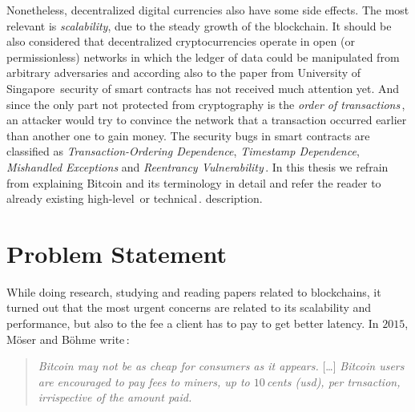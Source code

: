 \documentclass[USenglish]{uit-thesis}
\begin{document}
Nonetheless, decentralized digital currencies also have some side effects.
The most relevant is \emph{scalability}, due to the steady growth of the
blockchain. It should be also considered that
decentralized cryptocurrencies operate in open (or permissionless) networks
in which the ledger of data could be manipulated from arbitrary adversaries and
according also to the paper from University of Singapore\,\cite{Luu:2016}
security of smart contracts has not received much attention yet. And since the
only part not protected from cryptography is the \emph{order of transactions}\,\cite{ethereum_white_paper},
an attacker would try to convince the network that a transaction
occurred earlier than another one to gain money.
The security bugs in smart contracts are classified as \emph{Transaction-Ordering Dependence},
\emph{Timestamp Dependence}, \emph{Mishandled Exceptions}
and \emph{Reentrancy Vulnerability}\,\cite{Luu:2016}.
In this thesis we refrain from explaining Bitcoin and its terminology in detail
and refer the reader to already existing high-level\,\cite{Underwood:2016:BBB,
Bohme2015BETG}
or technical\,\cite{Nakamoto_bitcoin, ethereum_white_paper}.
 description.
\section{Problem Statement}
\label{sec:probdefinition}

While doing research, studying and reading papers related to blockchains,
it turned out that the most urgent concerns are related to
its scalability and performance, but also to the fee
a client has to pay to get better latency.
In $2015$, Möser and Böhme write\,\cite{Moser2015}:
\begin{quote}
	\emph{Bitcoin may not be as cheap for consumers as it appears.}
	[\dots]
	\emph{Bitcoin users are encouraged to pay fees to miners, up
	to $10$\,cents (\gls{usd}), per trnsaction, irrispective of the amount
paid.}
\end{quote}
\end{document}
